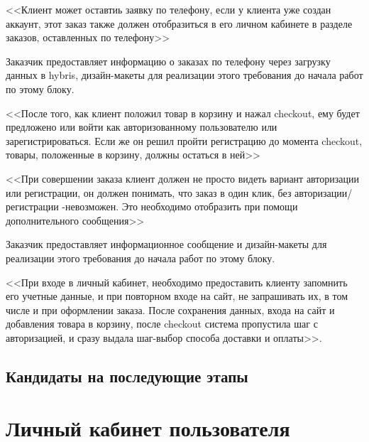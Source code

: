 {
<<Клиент может оставтиь заявку по телефону, если у клиента уже создан аккаунт, этот заказ также должен отобразиться в его личном кабинете в разделе заказов, оставленных по телефону>> 

Заказчик предоставляет информацию о заказах по телефону через загрузку данных в hybris, дизайн-макеты для реализации этого требования до начала работ по этому блоку.
}
{
<<После того, как клиент положил товар в корзину и нажал checkout, ему будет предложено или войти как авторизованному пользователю или зарегистрироваться. Если же он решил пройти регистрацию до момента checkout, товары, положенные в корзину, должны остаться в ней>>
}
{
<<При совершении заказа клиент должен не просто видеть вариант авторизации или регистрации, он должен понимать, что заказ в один клик, без авторизации/регистрации -невозможен. Это необходимо отобразить при помощи дополнительного сообщения>>

Заказчик предоставляет информационное сообщение и дизайн-макеты для реализации этого требования до начала работ по этому блоку.
}
{
<<При входе в личный кабинет, необходимо предоставить клиенту запомнить его учетные данные, и при повторном входе на сайт, не запрашивать их, в том числе и при оформлении заказа. После сохранения данных, входа на сайт и добавления товара в корзину, после checkout система пропустила шаг с авторизацией, и сразу выдала шаг-выбор способа доставки и оплаты>>. 
}
\subsection{Кандидаты на последующие этапы}

\section{Личный кабинет пользователя}

